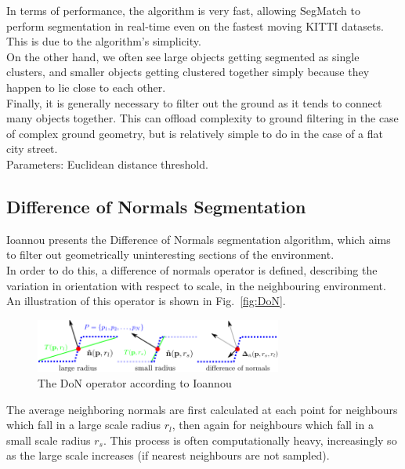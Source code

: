 In terms of performance, the algorithm is very fast, allowing SegMatch to perform segmentation in real-time even on the fastest moving KITTI \cite{KITTI} datasets. This is due to the algorithm's simplicity.\\

On the other hand, we often see large objects getting segmented as single clusters, and smaller objects getting clustered together simply because they happen to lie close to each other.\\

Finally, it is generally necessary to filter out the ground as it tends to connect many objects together. This can offload complexity to ground filtering in the case of complex ground geometry, but is relatively simple to do in the case of a flat city street.\\

Parameters: Euclidean distance threshold.

\subsection{Difference of Normals Segmentation}
\label{subsec:DoN}

Ioannou \cite{ioannou2012difference} presents the Difference of Normals segmentation algorithm, which aims to filter out geometrically uninteresting sections of the environment.\\

In order to do this, a difference of normals operator is defined, describing the variation in orientation with respect to scale, in the neighbouring environment. An illustration of this operator is shown in Fig.~\ref{fig:DoN}.\\

\begin{figure}
  \centering
  \includegraphics[width=3.2in]{images/DoN.png}
  \caption{The DoN operator according to Ioannou \cite{ioannou2012difference}}
  \label{fig:hierarchical}
\end{figure}

The average neighboring normals are first calculated at each point for neighbours which fall in a large scale radius $r_l$, then again for neighbours which fall in a small scale radius $r_s$. This process is often computationally heavy, increasingly so as the large scale increases (if nearest neighbours are not sampled).\\

